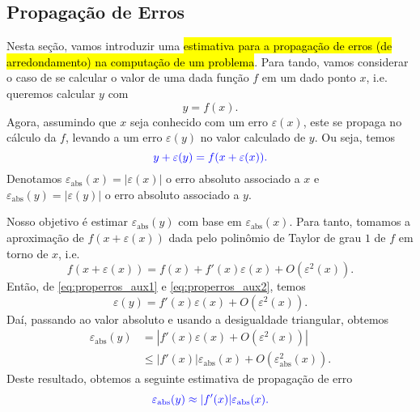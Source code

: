 \subsection{Propagação de Erros}

Nesta seção, vamos introduzir uma \hl{estimativa para a propagação de erros (de arredondamento) na computação de um problema}. Para tando, vamos considerar o caso de se calcular o valor de uma dada função $f$ em um dado ponto $x$, i.e. queremos calcular $y$ com
\begin{equation}\label{eq:properros_aux1}
  y = f(x).
\end{equation}
Agora, assumindo que $x$ seja conhecido com um erro $\varepsilon(x)$, este se propaga no cálculo da $f$, levando a um erro $\varepsilon(y)$ no valor calculado de $y$. Ou seja, temos
\begin{equation}\label{eq:properros_aux2}
  \color{blue}y + \varepsilon(y) = f(x+\varepsilon(x)).
\end{equation}
Denotamos $\varepsilon_{\text{abs}}(x) = |\varepsilon(x)|$ o erro absoluto associado a $x$ e $\varepsilon_{\text{abs}}(y) = |\varepsilon(y)|$ o erro absoluto associado a $y$.

Nosso objetivo é estimar $\varepsilon_{\text{abs}}(y)$ com base em $\varepsilon_{\text{abs}}(x)$. Para tanto, tomamos a aproximação de $f(x+\varepsilon(x))$ dada pelo polinômio de Taylor de grau $1$ de $f$ em torno de $x$, i.e.
\begin{equation}
  f(x+\varepsilon(x)) = f(x) + f'(x)\varepsilon(x) + O\left(\varepsilon^2(x)\right).
\end{equation}
Então, de \eqref{eq:properros_aux1} e \eqref{eq:properros_aux2}, temos
\begin{equation}
  \varepsilon(y) = f'(x)\varepsilon(x) + O(\varepsilon^2(x)).
\end{equation}
Daí, passando ao valor absoluto e usando a desigualdade triangular, obtemos
\begin{align}
  \varepsilon_{\text{abs}}(y) &= \left|f'(x)\varepsilon(x) + O(\varepsilon^2(x))\right|\\
                              &\leq |f'(x)|\varepsilon_{\text{abs}}(x) + O\left(\varepsilon_{\text{abs}}^2(x)\right).
\end{align}
Deste resultado, obtemos a seguinte estimativa de propagação de erro
\begin{equation}\label{eq:estproperro_1}
  \color{blue}\varepsilon_{\text{abs}}(y) \approx |f'(x)|\varepsilon_{\text{abs}}(x).
\end{equation}

